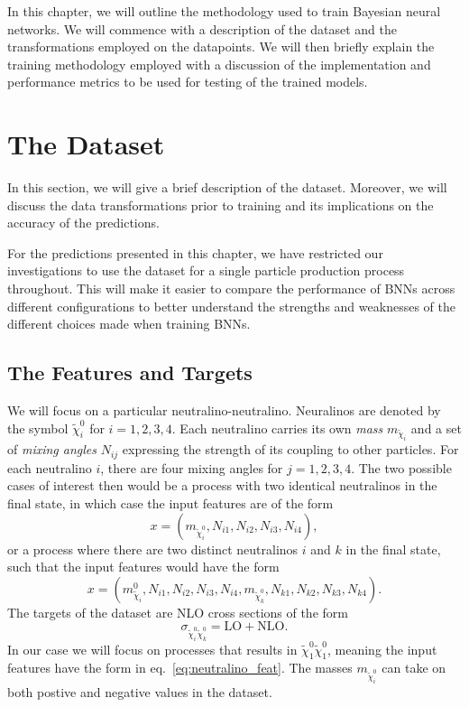 
In this chapter, we will outline the methodology used to train Bayesian neural networks. We will commence with a description of the dataset and the transformations employed on the datapoints. We will then briefly explain the training methodology employed with a discussion of the implementation and performance metrics to be used for testing of the trained models.

\section{The Dataset}\label{sec:dataset}
In this section, we will give a brief description of the dataset. Moreover, we will discuss the data transformations prior to training and its implications on the accuracy of the predictions.

For the predictions presented in this chapter, we have restricted our investigations to use the dataset for a single particle production process throughout. This will make it easier to compare the performance of BNNs across different configurations to better understand the strengths and weaknesses of the different choices made when training BNNs. 

\subsection{The Features and Targets}
We will focus on a particular neutralino-neutralino. Neuralinos are denoted by the symbol $\tilde{\chi}_i^0$ for $i = 1, 2, 3, 4$.
Each neutralino carries its own \textit{mass} $m_{\tilde{\chi}_i}$ and a set of \textit{mixing angles} $N_{ij}$ expressing the strength of its coupling to other particles. For each neutralino $i$, there are four mixing angles for $j = 1, 2, 3, 4$. The two possible cases of interest then would be a process with two identical neutralinos in the final state, in which case the input features are of the form
\begin{equation}\label{eq:neutralino_feat}
    x = (m_{\tilde{\chi}_i^0}, N_{i1}, N_{i2}, N_{i3}, N_{i4}),
\end{equation} 
or a process where there are two distinct neutralinos $i$ and $k$ in the final state, such that the input features would have the form
\begin{equation}
    x = (m_{\tilde{\chi}_i}^0, N_{i1}, N_{i2}, N_{i3}, N_{i4}, m_{\tilde{\chi}_k^0},  N_{k1}, N_{k2}, N_{k3}, N_{k4}).
\end{equation}
The targets of the dataset are NLO cross sections of the form
\begin{equation}
    \sigma_{\tilde{\chi}_i^0 \tilde{\chi}_k^0} = \text{LO} + \text{NLO}.
\end{equation}
In our case we will focus on processes that results in $\tilde{\chi}_1^0\tilde{\chi}_1^0$, meaning the input features have the form in eq.~\eqref{eq:neutralino_feat}. The masses $m_{\tilde{\chi}_i^0}$ can take on both postive and negative values in the dataset. 

